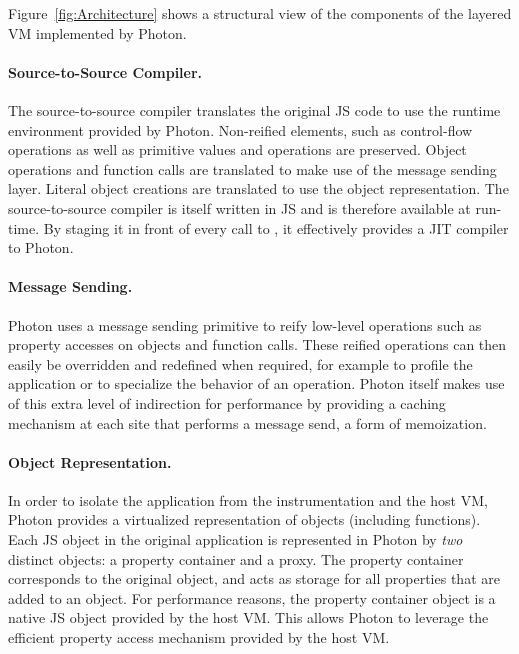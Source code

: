 Figure~\ref{fig:Architecture} shows a structural view of the components of the
layered VM implemented by Photon.

\paragraph{Source-to-Source Compiler.} The source-to-source compiler translates
the original JS code to use the runtime environment provided by
Photon.  Non-reified elements, such as control-flow operations as well as
primitive values and operations are preserved. Object operations and function
calls are translated to make use of the message sending layer. Literal object
creations are translated to use the object representation. The
source-to-source compiler is itself written in JS and is therefore available
at run-time. By staging it in front of every call to , it effectively
provides a JIT compiler to Photon.

\paragraph{Message Sending.} Photon uses a message sending primitive to reify
low-level operations such as property accesses on objects and function calls.
These reified operations can then easily be overridden and redefined when
required, for example to profile the application or to specialize the behavior
of an operation. Photon itself makes use of this extra level of indirection for
performance by providing a caching mechanism at each site that performs a
message send, a form of memoization.

\paragraph{Object Representation.} In order to isolate the application from
the instrumentation and the host VM, Photon provides a virtualized
representation of objects (including functions). Each JS object in the
original application is represented in Photon by \emph{two} distinct objects:
a property container and a proxy. The property container corresponds to the
original object, and acts as storage for all properties that are added to an
object. For performance reasons, the property container object is a native JS
object provided by the host VM. This allows Photon to leverage the efficient
property access mechanism provided by the host VM.

